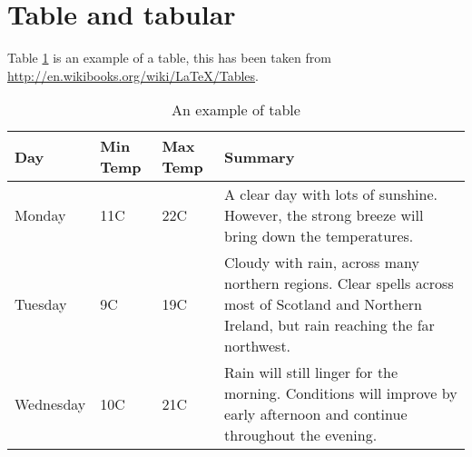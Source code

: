 \section{Table and tabular}
Table \ref{my_table} is an example of a table, this has been taken from \url{http://en.wikibooks.org/wiki/LaTeX/Tables}.
\begin{table}
\begin{center}
    \begin{tabular}{ | l | l | l | p{5cm} |}
    \hline
    Day & Min Temp & Max Temp & Summary \\ \hline
    Monday & 11C & 22C & A clear day with lots of sunshine.  
    However, the strong breeze will bring down the temperatures. \\ \hline
    Tuesday & 9C & 19C & Cloudy with rain, across many northern regions. Clear spells 
    across most of Scotland and Northern Ireland, 
    but rain reaching the far northwest. \\ \hline
    Wednesday & 10C & 21C & Rain will still linger for the morning. 
    Conditions will improve by early afternoon and continue 
    throughout the evening. \\
    \hline
    \end{tabular}
\end{center}
\caption{An example of table}
  \label{my_table}
\end{table}

